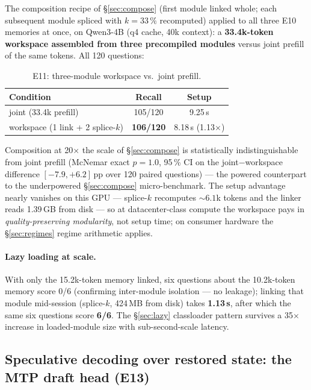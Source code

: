 \documentclass[11pt]{article}
\begin{document}
The composition recipe of \S\ref{sec:compose} (first module linked whole; each subsequent module spliced with $k = 33\,\%$ recomputed) applied to all three E10 memories at once, on Qwen3-4B (q4 cache, 40k context): a \textbf{33.4k-token workspace assembled from three precompiled modules} versus joint prefill of the same tokens. All 120 questions:

\begin{table}[h]
  \centering\small
  \caption{E11: three-module workspace vs.\ joint prefill.}
  \begin{tabular}{lcc}
    \toprule
    Condition & Recall & Setup \\
    \midrule
    joint (33.4k prefill) & 105/120 & 9.25\,s \\
    workspace (1 link + 2 splice-$k$) & \textbf{106/120} & 8.18\,s (1.13$\times$) \\
    \bottomrule
  \end{tabular}
\end{table}

Composition at 20$\times$ the scale of \S\ref{sec:compose} is statistically indistinguishable from joint prefill (McNemar exact $p=1.0$, 95\,\% CI on the joint$-$workspace difference $[-7.9, +6.2]$\,pp over 120 paired questions) --- the powered counterpart to the underpowered \S\ref{sec:compose} micro-benchmark. The setup advantage nearly vanishes on this GPU --- splice-$k$ recomputes ${\sim}6.1$k tokens and the linker reads 1.39\,GB from disk --- so at datacenter-class compute the workspace pays in \emph{quality-preserving modularity}, not setup time; on consumer hardware the \S\ref{sec:regimes} regime arithmetic applies.

\paragraph{Lazy loading at scale.}
With only the 15.2k-token memory linked, six questions about the 10.2k-token memory score 0/6 (confirming inter-module isolation --- no leakage); linking that module mid-session (splice-$k$, 424\,MB from disk) takes \textbf{1.13\,s}, after which the same six questions score \textbf{6/6}. The \S\ref{sec:lazy} classloader pattern survives a 35$\times$ increase in loaded-module size with sub-second-scale latency.

\subsection{Speculative decoding over restored state: the MTP draft head (E13)}
\label{sec:mtp}
\end{document}
